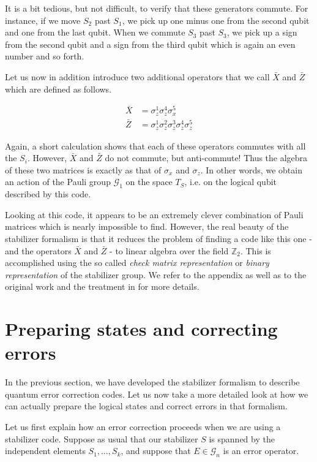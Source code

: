 \documentclass[a4paper, draft]{article}
\theoremstyle{own}
\theoremstyle{remark}
\newcommand{\Z}{\mathbb{Z}}
\begin{document}
It is a bit tedious, but not difficult, to verify that these generators commute. For instance, if we move $S_2$ past $S_1$, we pick up one minus one from the second qubit and one from the last qubit. When we commute $S_3$ past $S_3$, we pick up a sign from the second qubit and  a sign from the third qubit which is again an even number and so forth. 

Let us now in addition introduce two additional operators that we call $\bar{X}$ and $\bar{Z}$ which are defined as follows.

\begin{align*}
\bar{X} &= \sigma_z^1 \sigma_z^4 \sigma_x^5 \\
\bar{Z} &= \sigma_z^1 \sigma_z^2 \sigma_z^3 \sigma_z^4 \sigma_z^5
\end{align*}

Again, a short calculation shows that each of these operators commutes with all the $S_i$. However, $\bar{X}$ and $\bar{Z}$ do not commute, but anti-commute! Thus the algebra of these two matrices is exactly as that of $\sigma_x$ and $\sigma_z$. In other words, we obtain an action of the Pauli group $\mathcal{G}_1$ on the space $T_S$, i.e. on the logical qubit described by this code.

Looking at this code, it appears to be an extremely clever combination of Pauli matrices which is nearly impossible to find. However, the real beauty of the stabilizer formalism is that it reduces the problem of finding a code like this one - and the operators $\bar{X}$ and $\bar{Z}$ - to linear algebra over the field $\Z_2$. This is accomplished using the so called \emph{check matrix representation} or \emph{binary representation} of the stabilizer group. We refer to the appendix as well as to the original work \cite{GThesis} and the treatment in \cite{NC} for more details.


\section{Preparing states and correcting errors}

In the previous section, we have developed the stabilizer formalism to describe quantum error correction codes. Let us now take a more detailed look at how we can actually prepare the logical states and correct errors in that formalism.

Let us first explain how an error correction proceeds when we are using a stabilizer code. Suppose as usual that our stabilizer $S$ is spanned by the independent elements $S_1, \dots, S_k$, and suppose that $E \in \mathcal{G}_n$ is an error operator.
\end{document}
